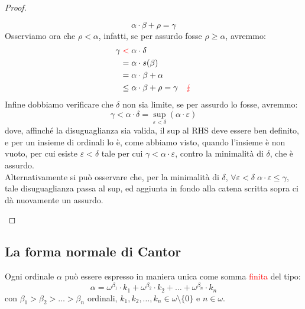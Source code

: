 \begin{proof}
\begin{itemize}
		\[ \alpha \cdot \beta + \rho = \gamma
			\]
		Osserviamo ora che $\rho < \alpha$, infatti, se per assurdo fosse $\rho \geq \alpha$, avremmo:
		\begin{align*}
			\gamma & \;\textcolor{red}{<} \; \alpha \cdot \delta \\
				   & = \alpha \cdot s(\beta) \\
				   & = \alpha \cdot \beta + \alpha \\
				   & \leq \alpha \cdot \beta + \rho = \gamma \quad \textcolor{red}{\lightning}
		\end{align*}
		Infine dobbiamo verificare che $\delta$ non sia limite, se per assurdo lo fosse, avremmo:
		\[ \gamma < \alpha \cdot \delta = \sup_{\varepsilon < \delta} (\alpha \cdot \varepsilon)
			\]
		dove, affinché la disuguaglianza sia valida, il sup al RHS deve essere ben definito, e per un insieme di ordinali lo è, come abbiamo visto, quando l'insieme è non vuoto,
		per cui esiste $\varepsilon < \delta$ tale per cui $\gamma < \alpha \cdot \varepsilon$, contro la minimalità di $\delta$, che è assurdo.\\
		Alternativamente si può osservare che, per la minimalità di $\delta$, $\forall \varepsilon < \delta \; \alpha \cdot \varepsilon \leq \gamma$, tale disuguaglianza passa al sup,
		ed aggiunta in fondo alla catena scritta sopra ci dà nuovamente un assurdo.
	\end{itemize}
\end{proof}

\subsection{La forma normale di Cantor}

\begin{theorem}
	Ogni ordinale $\alpha$ può essere espresso in maniera unica come somma \textcolor{red}{finita} del tipo:
	\[ \alpha = \omega^{\beta_1} \cdot k_1 + \omega^{\beta_2} \cdot k_2 + \ldots + \omega^{\beta_n} \cdot k_n
		\]
	con $\beta_1 > \beta_2 > \ldots > \beta_n$ ordinali, $k_1,k_2,\ldots,k_n \in \omega\setminus\{0\}$ e $n \in \omega$.
\end{theorem}


